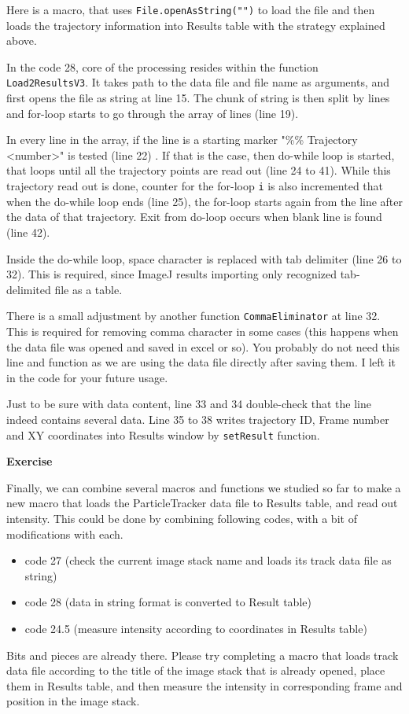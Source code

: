 \documentclass[11pt,a4paper,oneside]{report}
\newenvironment{indentexercise}[1]%
{{\setlength{\leftmargin}{2em}}%
\textbf{Exercise \thesubsection-#1}%
\begin{list}{}%
	\item%
}
{\end{list}}
\newcommand{\ilcom}[1]{\texttt{\small#1}}
\begin{document}
Here is a macro, that uses \ilcom{File.openAsString("")} to load the file and then loads the trajectory information 
into Results table with the strategy explained above. 



In the code 28, core of the processing resides within the function \ilcom{Load2ResultsV3}. 
It takes path to the data file and file name as arguments, and first opens the file as string at line 15. 
The chunk of string is then split by lines and for-loop starts to go through the array of lines (line 19). 

In every line in the array, if the line is a starting marker "\%\% Trajectory <number>" is tested (line 22) . 
If that is the case, then do-while loop is started, that loops until all the trajectory points are read out (line 24 to 41). 
While this trajectory read out is done, counter for the for-loop \ilcom{i} 
is also incremented that when the do-while loop ends (line 25), the for-loop starts again from the 
line after the data of that trajectory. Exit from do-loop occurs when blank line is found (line 42). 

Inside the do-while loop, space character is replaced with tab delimiter (line 26 to 32). 
This is required, since ImageJ results importing only recognized tab-delimited file as a table.  

There is a small adjustment by another function \ilcom{CommaEliminator} at line 32. 
This is required for removing comma character in some cases (this happens when the data file was opened and saved in excel or so). 
You probably do not need this line and function as we are using the data file directly after saving them. I left it in the code for your future usage. 

Just to be sure with data content, line 33 and 34 double-check that the line indeed contains several data. 
Line 35 to 38 writes trajectory ID, Frame number and XY coordinates into Results window by \ilcom{setResult} function.

\begin{indentexercise}{2}
\item Finally, we can combine several macros and functions we studied so far to make a new macro 
that loads the ParticleTracker data file to Results table, and read out intensity. 
This could be done by combining following codes, with a bit of modifications with each. 
\begin{itemize}
\item code 27 (check the current image stack name and loads its track data file as string)
\item code 28 (data in string format is converted to Result table)
\item code 24.5 (measure intensity according to coordinates in Results table)
\end{itemize}
Bits and pieces are already there. Please try completing a macro that loads track data file according 
to the title of the image stack that is already opened, place them in Results table, and then measure 
the intensity in corresponding frame and position in the image stack. 
\end{indentexercise}
\end{document}
